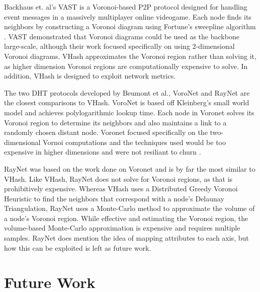 \documentclass{IEEEtran}
\begin{document}
Backhaus et. al's  VAST \cite{Backhaus:2007:VAS:1326257.1326266} is a Voronoi-based P2P protocol designed for handling event messages in a massively multiplayer online videogame.  
Each node finds its neighbors by constructing a Voronoi diagram using Fortune's sweepline algorithm \cite{fortune1987sweepline}.  
VAST demonstrated that Voronoi diagrams could be used as the backbone  large-scale, although their work focused specifically on using 2-dimensional Voronoi diagrams.  
VHash approximates the Voronoi region rather than solving it, as higher dimension Voronoi regions are computationally expensive to solve.
In addition, VHash is designed to exploit network metrics.

The two DHT protocols developed by Beumont et al., VoroNet \cite{voronet} and RayNet \cite{raynet} are the closest comparisons to VHash.
VoroNet is based off Kleinberg's small world model \cite{kleinberg2000navigation} and achieves polylogarithmic lookup time.  
Each node in Voronet solves its Voronoi region to determine its neighbors and also maintains a link to a randomly chosen distant node.
Voronet focused specifically on the two-dimensional Vornoi computations and the techniques used would be too expensive in higher dimensions and were not resiliant to churn  \cite{raynet}.

RayNet \cite{raynet} was based on the work done on Voronet and is by far the most similar to VHash.  
Like VHash, RayNet does not solve for Voronoi regions, as that is prohibitively expensive.  
Whereas VHash uses a Distributed Greedy Voronoi Heuristic to find the neighbors that correspond with a node's Delaunay Triangulation,  RayNet uses a Monte-Carlo method to approximate the volume of a node's Voronoi region.  
While effective and estimating the Voronoi region,  the volume-based Monte-Carlo approximation is expensive and requires multiple samples. 
RayNet does mention the idea of mapping attributes to each axis, but how this can be exploited is left as future work.



 

\section{Future Work}



\end{document}

